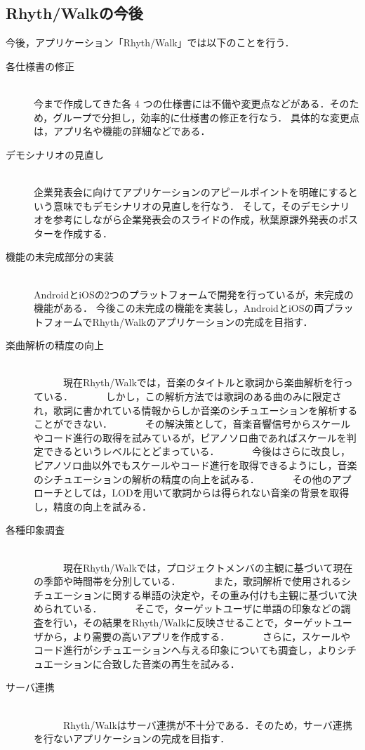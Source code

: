 \subsection{Rhyth/Walkの今後}
\par
今後，アプリケーション「Rhyth/Walk」では以下のことを行う．

\begin{description}
 \item[各仕様書の修正]\mbox{}\\ 
	    今まで作成してきた各 4 つの仕様書には不備や変更点などがある．そのため，グループで分担し，効率的に仕様書の修正を行なう．
	    具体的な変更点は，アプリ名や機能の詳細などである．
	    
 \item[デモシナリオの見直し]\mbox{}\\
	    企業発表会に向けてアプリケーションのアピールポイントを明確にするという意味でもデモシナリオの見直しを行なう．
	    そして，そのデモシナリオを参考にしながら企業発表会のスライドの作成，秋葉原課外発表のポスターを作成する．

 \item[機能の未完成部分の実装]\mbox{}\\
	    AndroidとiOSの2つのプラットフォームで開発を行っているが，未完成の機能がある．
	    今後この未完成の機能を実装し，AndroidとiOSの両プラットフォームでRhyth/Walkのアプリケーションの完成を目指す．

\item[楽曲解析の精度の向上]\mbox{}\\
　　　現在Rhyth/Walkでは，音楽のタイトルと歌詞から楽曲解析を行っている．
　　　しかし，この解析方法では歌詞のある曲のみに限定され，歌詞に書かれている情報からしか音楽のシチュエーションを解析することができない．
　　　その解決策として，音楽音響信号からスケールやコード進行の取得を試みているが，ピアノソロ曲であればスケールを判定できるというレベルにとどまっている．
　　　今後はさらに改良し，ピアノソロ曲以外でもスケールやコード進行を取得できるようにし，音楽のシチュエーションの解析の精度の向上を試みる．
　　　その他のアプローチとしては，LODを用いて歌詞からは得られない音楽の背景を取得し，精度の向上を試みる．
　　　
\item[各種印象調査]\mbox{}\\
　　　現在Rhyth/Walkでは，プロジェクトメンバの主観に基づいて現在の季節や時間帯を分別している．
　　　また，歌詞解析で使用されるシチュエーションに関する単語の決定や，その重み付けも主観に基づいて決められている．
　　　そこで，ターゲットユーザに単語の印象などの調査を行い，その結果をRhyth/Walkに反映させることで，ターゲットユーザから，より需要の高いアプリを作成する．
　　　さらに，スケールやコード進行がシチュエーションへ与える印象についても調査し，よりシチュエーションに合致した音楽の再生を試みる．
　　　
\item[サーバ連携]\mbox{}\\
　　　Rhyth/Walkはサーバ連携が不十分である．そのため，サーバ連携を行ないアプリケーションの完成を目指す．


\end{description}
